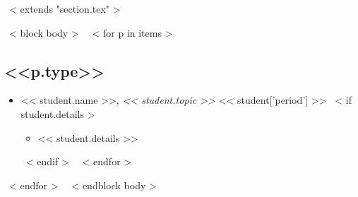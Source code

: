 ~< extends "section.tex" >~

~< block body >~
~< for p in items >~
\subsection{<<p.type>>}
  \begin{itemize}
    ~< for student in p.students >~
      \item << student.name >>, \textit{<< student.topic >>} \hfill << student['period'] >>
      ~< if student.details >~
        \begin{itemize}
        \item << student.details >>
        \end{itemize}
      ~< endif >~
    ~< endfor >~
  \end{itemize}
~< endfor >~
~< endblock body >~

